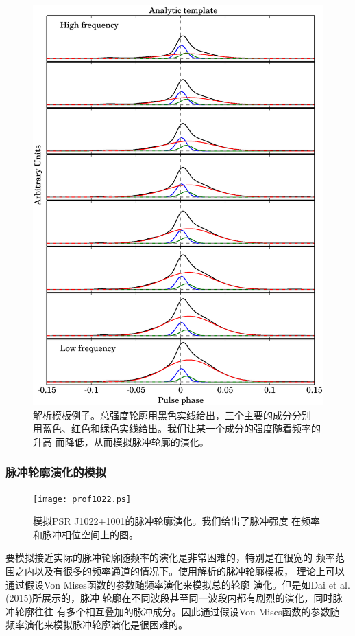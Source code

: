 \begin{figure}
\center
\includegraphics[width=4.5 in,trim=2cm 0cm 2cm 2cm]{template.ps}
\caption{解析模板例子。总强度轮廓用黑色实线给出，三个主要的成分分别
用蓝色、红色和绿色实线给出。我们让某一个成分的强度随着频率的升高
而降低，从而模拟脉冲轮廓的演化。} 
\label{template}
\end{figure}

\subsubsection{脉冲轮廓演化的模拟}

\begin{figure}
\center
\texttt{[image: prof1022.ps]}
\caption{模拟PSR J1022$+$1001的脉冲轮廓演化。我们给出了脉冲强度
在频率和脉冲相位空间上的图。} 
\label{1022prof}
\end{figure}

要模拟接近实际的脉冲轮廓随频率的演化是非常困难的，特别是在很宽的
频率范围之内以及有很多的频率通道的情况下。使用解析的脉冲轮廓模板，
理论上可以通过假设Von Mises函数的参数随频率演化来模拟总的轮廓
演化。但是如Dai et al. (2015)\supercite{dhm+15}所展示的，脉冲
轮廓在不同波段甚至同一波段内都有剧烈的演化，同时脉冲轮廓往往
有多个相互叠加的脉冲成分。因此通过假设Von Mises函数的参数随
频率演化来模拟脉冲轮廓演化是很困难的。

